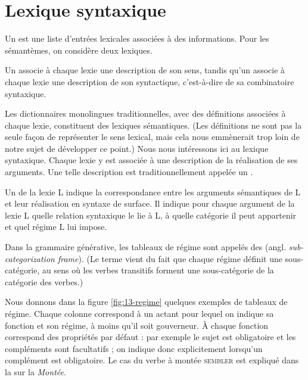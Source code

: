 \section{Lexique syntaxique}
Un  est une liste d’entrées lexicales associées à des informations. Pour les sémantèmes, on considère deux lexiques.

{Un  associe à chaque lexie une description de son sens, tandis qu’un  associe à chaque lexie une description de son syntactique, c'est-à-dire de sa combinatoire syntaxique.}

Les dictionnaires monolingues traditionnelles, avec des définitions associées à chaque lexie, constituent des lexiques sémantiques. (Les définitions ne sont pas la seule façon de représenter le sens lexical, mais cela nous emmènerait trop loin de notre sujet de développer ce point.) Nous nous intéressons ici au lexique syntaxique. Chaque lexie y est associée à une description de la réalisation de ses arguments. Une telle description est traditionnellement appelée un . 

{Un  de la lexie L indique la correspondance entre les arguments sémantiques de L et leur réalisation en syntaxe de surface. Il indique pour chaque argument de la lexie L quelle relation syntaxique le lie à L, à quelle catégorie il peut appartenir et quel régime L lui impose.}

Dans la grammaire générative, les tableaux de régime sont appelés des  (angl. \textit{sub-categorization frame}). (Le terme vient du fait que chaque régime définit une sous-catégorie, au sens où les verbes transitifs forment une sous-catégorie de la catégorie des verbes.)

Nous donnons dans la figure \ref{fig:13-regime} quelques exemples de tableaux de régime. Chaque colonne correspond à un actant pour lequel on indique sa fonction et son régime, à moins qu'il soit gouverneur. À chaque fonction correspond des propriétés par défaut : par exemple le sujet est obligatoire et les compléments sont facultatifs ; on indique donc explicitement lorsqu'un complément est obligatoire. Le cas du verbe à montée \textsc{sembler} est expliqué dans la  sur la \textit{Montée}.


